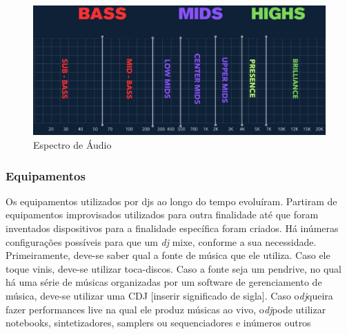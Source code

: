 \begin{figure}[h]
	\centering
    \includegraphics[scale=0.4]{figuras/fig09.eps}
	\caption{Espectro de Áudio}
	\label{fig09}
\end{figure}


\subsubsection{Equipamentos}
Os equipamentos utilizados por djs ao longo do tempo evoluíram. Partiram de equipamentos improvisados utilizados para outra finalidade até que foram inventados dispositivos para a finalidade específica foram criados.
Há inúmeras configurações possíveis para que um \textit{dj} mixe, conforme a sua necessidade. Primeiramente, deve-se saber qual a fonte de música que ele utiliza. Caso ele toque vinis, deve-se utilizar toca-discos. Caso a fonte seja um pendrive, no qual há uma série de músicas organizadas por um software de gerenciamento de música, deve-se utilizar uma CDJ [inserir significado de sigla]. Caso o\textit{dj}queira fazer performances live na qual ele produz músicas ao vivo, o\textit{dj}pode utilizar notebooks, sintetizadores, samplers ou sequenciadores e inúmeros outros 


